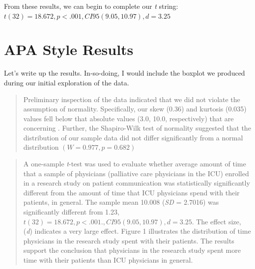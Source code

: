\documentclass[
  11pt,
]{book}
\newenvironment{Shaded}{\begin{snugshade}}{\end{snugshade}}
\newcommand{\AttributeTok}[1]{\textcolor[rgb]{0.27,0.27,0.27}{#1}}
\newcommand{\ConstantTok}[1]{\textcolor[rgb]{0.37,0.37,0.37}{#1}}
\newcommand{\FunctionTok}[1]{\textcolor[rgb]{0.27,0.27,0.27}{\textbf{#1}}}
\newcommand{\NormalTok}[1]{#1}
\newcommand{\SpecialCharTok}[1]{\textcolor[rgb]{0.43,0.43,0.43}{\textbf{#1}}}
\newcommand{\StringTok}[1]{\textcolor[rgb]{0.5,0.5,0.5}{#1}}
\begin{document}
From these results, we can begin to complete our \emph{t} string: \(t(32) = 18.672, p < .001, CI95(9.05, 10.97), d = 3.25\)

\hypertarget{apa-style-results}{%
\section{APA Style Results}\label{apa-style-results}}

Let's write up the results. In-so-doing, I would include the boxplot we produced during our initial exploration of the data.

\begin{quote}
Preliminary inspection of the data indicated that we did not violate the assumption of normality. Specifically, our skew (0.36) and kurtosis (0.035) values fell below that absolute values (3.0, 10.0, respectively) that are concerning \citep{kline_data_2016}. Further, the Shapiro-Wilk test of normality suggested that the distribution of our sample data did not differ significantly from a normal distribution \((W = 0.977, p = 0.682)\)
\end{quote}

\begin{quote}
A one-sample \emph{t}-test was used to evaluate whether average amount of time that a sample of physicians (palliative care physicians in the ICU) enrolled in a research study on patient communication was statistically significantly different from the amount of time that ICU physicians spend with their patients, in general. The sample mean 10.008 (\emph{SD} = 2.7016) was significantly different from 1.23, \(t(32) = 18.672, p < .001., CI95(9.05, 10.97), d = 3.25\). The effect size, (\emph{d}) indicates a very large effect. Figure 1 illustrates the distribution of time physicians in the research study spent with their patients. The results support the conclusion that physicians in the research study spent more time with their patients than ICU physicians in general.
\end{quote}

\begin{Shaded}
\end{Shaded}
\end{document}
